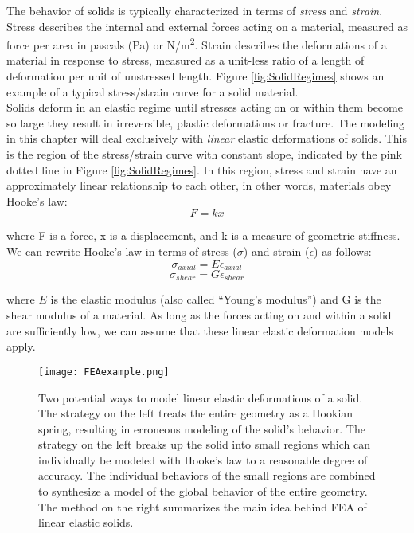 {The behavior of solids is typically characterized in terms of \textit{stress} and \textit{strain}.  Stress describes the internal and external forces acting on a material, measured as force per area in pascals (Pa) or N/m\textsuperscript{2}.  Strain describes the deformations of a material in response to stress, measured as a unit-less ratio of a length of deformation per unit of unstressed length.  Figure \ref{fig:SolidRegimes} shows an example of a typical stress/strain curve for a solid material.\\

Solids deform in an elastic regime until stresses acting on or within them become so large they result in irreversible, plastic deformations or fracture.  The modeling in this chapter will deal exclusively with \textit{linear} elastic deformations of solids.  This is the region of the stress/strain curve with constant slope, indicated by the pink dotted line in Figure \ref{fig:SolidRegimes}.  In this region, stress and strain have an approximately linear relationship to each other, in other words, materials obey Hooke's law:
\[F = kx\]

where F is a force, x is a displacement, and k is a measure of geometric stiffness.  We can rewrite Hooke's law in terms of stress ($\sigma$) and strain ($\epsilon$) as follows:
\begin{equation}\label{eq:stressstrainaxial}
\sigma_{axial} = E\epsilon_{axial} 
\end{equation}
\begin{equation}\label{eq:stressstrainshear}
\sigma_{shear} = G\epsilon_{shear} 
\end{equation}

where $E$ is the elastic modulus (also called ``Young's modulus'') and G is the shear modulus of a material.  As long as the forces acting on and within a solid are sufficiently low, we can assume that these linear elastic deformation models apply.\\

\begin{figure}
  \texttt{[image: FEAexample.png]}
  \caption{Two potential ways to model linear elastic deformations of a solid.  The strategy on the left treats the entire geometry as a Hookian spring, resulting in erroneous modeling of the solid's behavior.  The strategy on the left breaks up the solid into small regions which can individually be modeled with Hooke's law to a reasonable degree of accuracy.  The individual behaviors of the small regions are combined to synthesize a model of the global behavior of the entire geometry.  The method on the right summarizes the main idea behind FEA of linear elastic solids.}
  \label{fig:FEAexample}
\end{figure}

}
